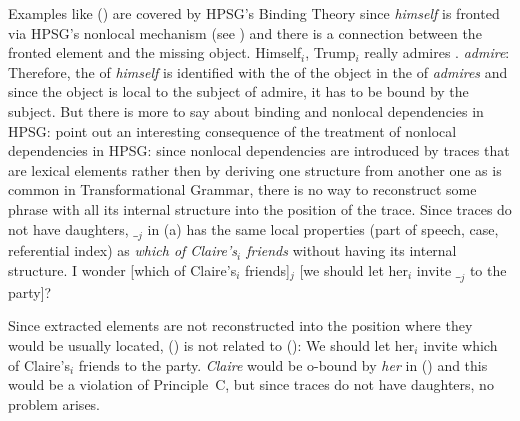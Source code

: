 \documentclass[output=paper
 	        ,biblatex
                ,babelshorthands
                ,newtxmath
                ,draftmode
                ,colorlinks, citecolor=brown
]{langscibook}
\begin{document}
Examples like () are covered by HPSG's Binding Theory since \emph{himself} is fronted via
HPSG's nonlocal mechanism (see ) and there is a connection between the
fronted element and the missing object.
\eal
\ex Himself$_i$, Trump$_i$ really admires \trace.
\ex \emph{admire}:\\
    \argst {}
\zl
Therefore, the \localv of \emph{himself} is identified with the \localv of the object in the \argstl of
\emph{admires} and since the object is local to the subject of admire, it has to be bound by the
subject. But there is more to say about binding and nonlocal dependencies in HPSG:
\citet[]{ps2} point out an interesting consequence of the treatment of nonlocal
dependencies in HPSG: since nonlocal dependencies are introduced by traces that are lexical elements
rather then by deriving one structure from another one as is common in Transformational Grammar,
there is no way to reconstruct some phrase with all its internal structure into the position of the
trace. Since traces do not have daughters, $\__j$ in (a) has the same local properties (part
of speech, case, referential index) as \emph{which of Claire's$_i$ friends} without having its
internal structure. 
\ea
\label{ex-which-of-clairs-friends}
I wonder [which of Claire's$_i$ friends]$_j$ [we should let her$_i$ invite $\__j$ to the party]?
\z

Since extracted elements are not reconstructed into the position where they would be usually
located, () is not related to ():
\ea
We should let her$_i$ invite which of Claire's$_i$ friends to the party.
\z
\emph{Claire} would be o-bound by \emph{her} in () and this would be a violation of
Principle~C, but since traces do not have daughters, no problem arises. 
\end{document}
